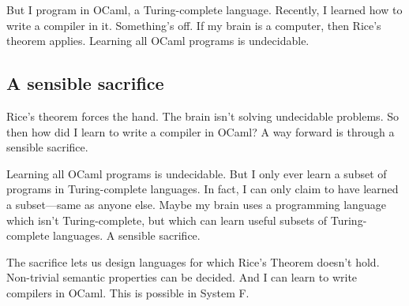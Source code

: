 But I program in OCaml, a Turing-complete language. Recently, I learned how to write a compiler in it. Something's off. If my brain is a computer, then Rice's theorem applies. Learning all OCaml programs is undecidable. 

\subsection{A sensible sacrifice}

Rice's theorem forces the hand. The brain isn't solving undecidable problems. So then how did I learn to write a compiler in OCaml? A way forward is through a sensible sacrifice.

Learning all OCaml programs is undecidable. But I only ever learn a subset of programs in Turing-complete languages. In fact, I can only claim to have learned a subset---same as anyone else. Maybe my brain uses a programming language which isn't Turing-complete, but which can learn useful subsets of Turing-complete languages. A sensible sacrifice.

The sacrifice lets us design languages for which Rice's Theorem doesn't hold. Non-trivial semantic properties can be decided. And I can learn to write compilers in OCaml. This is possible in System F.
